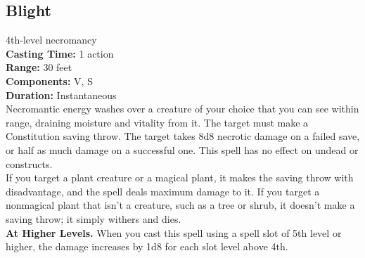 \documentclass[11pt, A4paper, english]{article}
\begin{document}
		\subsection{Blight}
4th-level necromancy \\
\textbf{Casting Time:} 1 action \\
\textbf{Range:} 30 feet \\
\textbf{Components:} V, S \\
\textbf{Duration:} Instantaneous \\
Necromantic energy washes over a creature of your choice that you can see within range, draining moisture and vitality from it. The target must make a Constitution saving throw. The target takes 8d8 necrotic damage on a failed save, or half as much damage on a successful one. This spell has no effect on undead or constructs. \\
If you target a plant creature or a magical plant, it makes the saving throw with disadvantage, and the spell deals maximum damage to it. If you target a nonmagical plant that isn't a creature, such as a tree or shrub, it doesn't make a saving throw; it simply withers and dies. \\
\textbf{At Higher Levels.} When you cast this spell using a spell slot of 5th level or higher, the damage increases by 1d8 for each slot level above 4th.
\end{document}
